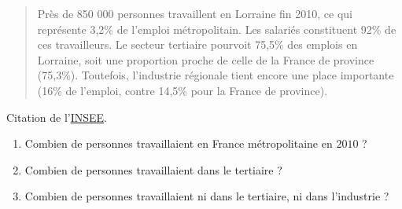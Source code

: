 
\begin{exercice}\label{exoPremiere-0005}

\begin{quote}
    Près de 850 000 personnes travaillent en Lorraine fin 2010, ce qui représente 3,2\% de l’emploi métropolitain. Les salariés constituent 92\% de ces travailleurs. Le secteur tertiaire pourvoit 75,5\% des emplois en Lorraine, soit une proportion proche de celle de la France de province (75,3\%). Toutefois, l’industrie régionale tient encore une place importante (16\% de l’emploi, contre 14,5\% pour la France de province). 
\end{quote}
Citation de l'\href{http://www.insee.fr/fr/regions/lor/reg-dep.asp?theme=3&suite=1}{INSEE}.

\begin{enumerate}
    \item
        Combien de personnes travaillaient en France métropolitaine en \( 2010\) ?
    \item
        Combien de personnes travaillaient dans le tertiaire ?
    \item
        Combien de personnes travaillaient ni dans le tertiaire, ni dans l'industrie ?
\end{enumerate}

\end{exercice}
